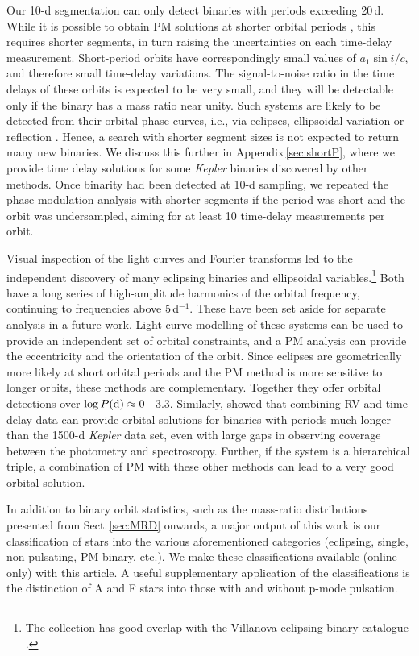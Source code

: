 \documentclass[a4paper,fleqn,usenatbib]{mnras}
\begin{document}
Our 10-d segmentation can only detect binaries with periods exceeding 20\,d. While it is possible to obtain PM solutions at shorter orbital periods \citep{schmidetal2015,murphyetal2016b}, this requires shorter segments, in turn raising the uncertainties on each time-delay measurement. Short-period orbits have correspondingly small values of $a_1 \sin i / c$, and therefore small time-delay variations. The signal-to-noise ratio in the time delays of these orbits is expected to be very small, and they will be detectable only if the binary has a mass ratio near unity. Such systems are likely to be detected from their orbital phase curves, i.e., via eclipses, ellipsoidal variation or reflection \citep{shporer2017}. Hence, a search with shorter segment sizes is not expected to return many new binaries. We discuss this further in Appendix\,\ref{sec:shortP}, where we provide time delay solutions for some \textit{Kepler} binaries discovered by other methods. Once binarity had been detected at 10-d sampling, we repeated the phase modulation analysis with shorter segments if the period was short and the orbit was undersampled, aiming for at least 10 time-delay measurements per orbit.

Visual inspection of the light curves and Fourier transforms led to the independent discovery of many eclipsing binaries and ellipsoidal variables.\footnote{The collection has good overlap with the Villanova eclipsing binary catalogue \citep[][\url{http://keplerebs.villanova.edu/}]{kirketal2016}.} Both have a long series of high-amplitude harmonics of the orbital frequency, continuing to frequencies above 5\,d$^{-1}$. These have been set aside for separate analysis in a future work. Light curve modelling of these systems can be used to provide an independent set of orbital constraints, and a PM analysis can provide the eccentricity and the orientation of the orbit. Since eclipses are geometrically more likely at short orbital periods and the PM method is more sensitive to longer orbits, these methods are complementary. Together they offer orbital detections over $\log P {\rm (d)} \approx 0$\,--\,3.3. Similarly, \citet{murphyetal2016b} showed that combining RV and time-delay data can provide orbital solutions for binaries with periods much longer than the 1500-d \textit{Kepler} data set, even with large gaps in observing coverage between the photometry and spectroscopy. Further, if the system is a hierarchical triple, a combination of PM with these other methods can lead to a very good orbital solution.

In addition to binary orbit statistics, such as the mass-ratio distributions presented from Sect.\,\ref{sec:MRD} onwards, a major output of this work is our classification of stars into the various aforementioned categories (eclipsing, single, non-pulsating, PM binary, etc.). We make these classifications available (online-only) with this article. A useful supplementary application of the classifications is the distinction of A and F stars into those with and without p-mode pulsation.
\end{document}
